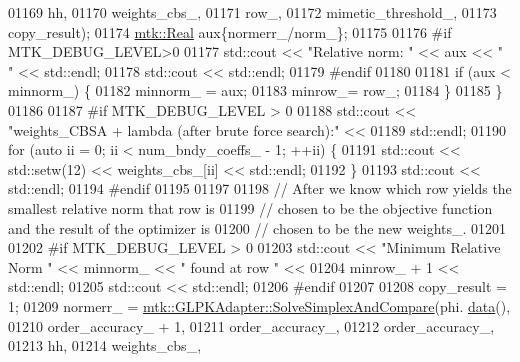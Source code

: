 \begin{DoxyCode}
{{01169                                                           hh,
01170                                                           weights\_cbs\_,
01171                                                           row\_,
01172                                                           mimetic\_threshold\_,
01173                                                           copy\_result);
01174       \hyperlink{group__c01-roots_gac080bbbf5cbb5502c9f00405f894857d}{mtk::Real} aux\{normerr\_/norm\_\};
01175 
01176 \textcolor{preprocessor}{      #if MTK\_DEBUG\_LEVEL>0}
01177       std::cout << \textcolor{stringliteral}{"Relative norm: "} << aux << \textcolor{stringliteral}{" "} << std::endl;
01178       std::cout << std::endl;
01179 \textcolor{preprocessor}{      #endif}
01180 
01181       \textcolor{keywordflow}{if} (aux < minnorm\_) \{
01182         minnorm\_ = aux;
01183         minrow\_= row\_;
01184       \}
01185     \}
01186 
01187 \textcolor{preprocessor}{    #if MTK\_DEBUG\_LEVEL > 0}
01188     std::cout << \textcolor{stringliteral}{"weights\_CBSA + lambda (after brute force search):"} <<
01189       std::endl;
01190     \textcolor{keywordflow}{for} (\textcolor{keyword}{auto} ii = 0; ii < num\_bndy\_coeffs\_ - 1; ++ii) \{
01191       std::cout << std::setw(12) << weights\_cbs\_[ii] << std::endl;
01192     \}
01193     std::cout << std::endl;
01194 \textcolor{preprocessor}{    #endif}
01195 
01197 
01198     \textcolor{comment}{// After we know which row yields the smallest relative norm that row is}
01199     \textcolor{comment}{// chosen to be the objective function and the result of the optimizer is}
01200     \textcolor{comment}{// chosen to be the new weights\_.}
01201 
01202 \textcolor{preprocessor}{    #if MTK\_DEBUG\_LEVEL > 0}
01203     std::cout << \textcolor{stringliteral}{"Minimum Relative Norm "} << minnorm\_ << \textcolor{stringliteral}{" found at row "} <<
01204       minrow\_ + 1 << std::endl;
01205     std::cout << std::endl;
01206 \textcolor{preprocessor}{    #endif}
01207 
01208     copy\_result = 1;
01209     normerr\_ = \hyperlink{classmtk_1_1GLPKAdapter_a834480aca83e3c0d09fdab7fdb7e8a3f}{mtk::GLPKAdapter::SolveSimplexAndCompare}(phi.
      \hyperlink{classmtk_1_1DenseMatrix_a16b3ff56feb2658b9fc7147d1de4d8e7}{data}(),
01210                                                         order\_accuracy\_ + 1,
01211                                                         order\_accuracy\_,
01212                                                         order\_accuracy\_,
01213                                                         hh,
01214                                                         weights\_cbs\_,
}}
\end{DoxyCode}
